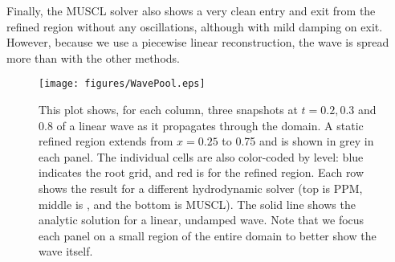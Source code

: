 Finally, the MUSCL solver also shows a very clean entry and exit from
the refined region without any oscillations, although with mild
damping on exit. However, because we use a piecewise linear
reconstruction, the wave is spread more than with the other methods.

\begin{figure}
\begin{center}
\texttt{[image: figures/WavePool.eps]}
\caption{This plot shows, for each column, three snapshots at $t=0.2,
0.3$ and 0.8 of a linear wave as it propagates through the domain.  A
static refined region extends from $x = 0.25$ to 0.75 and is shown in
grey in each panel.  The individual cells are also color-coded by
level: blue indicates the root grid, and red is for the refined
region.  Each row shows the result for a different hydrodynamic solver
(top is PPM, middle is \zeus, and the bottom is MUSCL).  The solid
line shows the analytic solution for a linear, undamped wave.  Note
that we focus each panel on a small region of the entire domain to
better show the wave itself.}
\label{fig.wavepool}
\end{center}
\end{figure}
